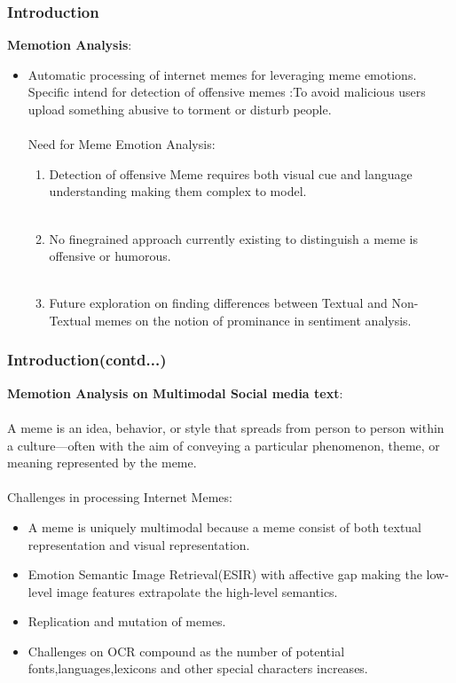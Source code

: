 \documentclass[]{beamer}
\begin{document}
\begin{frame}\frametitle{Introduction}
\textbf{Memotion Analysis}:\\
\begin{itemize}
\item Automatic processing of internet memes for leveraging meme emotions.\\
Specific intend for detection of offensive memes :To avoid malicious users upload something abusive to torment or disturb people.\\~\\
Need for Meme Emotion Analysis:
\begin{enumerate}
	\item Detection of offensive Meme requires both visual cue and language understanding making them complex to model.\\~\\
	\item No finegrained approach currently existing to distinguish a meme is offensive or humorous.\\~\\
	\item Future exploration on finding differences between Textual and Non-Textual memes on the notion of prominance in sentiment analysis.
\end{enumerate}
 \end{itemize}
\end{frame}
\begin{frame}\frametitle{Introduction(contd...)}
\textbf{Memotion Analysis on Multimodal Social media text}:\\~\\
	 A meme is an idea, behavior, or style that spreads from person to person within a culture—often with the aim of conveying a particular phenomenon, theme, or meaning represented by the meme.\\~\\ Challenges in processing Internet Memes:
\begin{itemize}
	\item A meme is uniquely multimodal because a meme consist of both textual representation and  visual representation. 
	\item Emotion Semantic Image Retrieval(ESIR) with affective gap making the low-level image features extrapolate the high-level semantics.
	\item Replication and mutation of memes.
	\item Challenges on OCR compound as the number of potential fonts,languages,lexicons and other special characters increases. 	
\end{itemize}
\end{frame}
\end{document}
